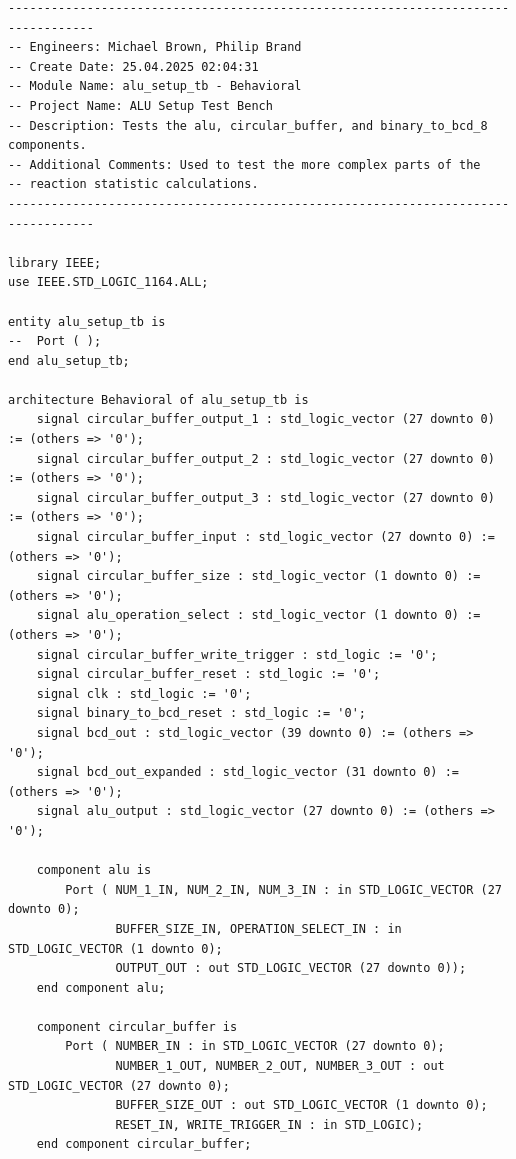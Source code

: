 \documentclass[11pt]{article}
\newenvironment{code}{\captionsetup{type=listing}}{}
\begin{document}
\vspace*{1cm}
\begin{code}
  \begin{verbatim}
----------------------------------------------------------------------------------
-- Engineers: Michael Brown, Philip Brand
-- Create Date: 25.04.2025 02:04:31
-- Module Name: alu_setup_tb - Behavioral
-- Project Name: ALU Setup Test Bench 
-- Description: Tests the alu, circular_buffer, and binary_to_bcd_8 components.
-- Additional Comments: Used to test the more complex parts of the 
-- reaction statistic calculations.
----------------------------------------------------------------------------------

library IEEE;
use IEEE.STD_LOGIC_1164.ALL;

entity alu_setup_tb is
--  Port ( );
end alu_setup_tb;

architecture Behavioral of alu_setup_tb is
    signal circular_buffer_output_1 : std_logic_vector (27 downto 0) := (others => '0');
    signal circular_buffer_output_2 : std_logic_vector (27 downto 0) := (others => '0');
    signal circular_buffer_output_3 : std_logic_vector (27 downto 0) := (others => '0');
    signal circular_buffer_input : std_logic_vector (27 downto 0) := (others => '0');
    signal circular_buffer_size : std_logic_vector (1 downto 0) := (others => '0');
    signal alu_operation_select : std_logic_vector (1 downto 0) := (others => '0');
    signal circular_buffer_write_trigger : std_logic := '0';
    signal circular_buffer_reset : std_logic := '0';
    signal clk : std_logic := '0';
    signal binary_to_bcd_reset : std_logic := '0';
    signal bcd_out : std_logic_vector (39 downto 0) := (others => '0');
    signal bcd_out_expanded : std_logic_vector (31 downto 0) := (others => '0');
    signal alu_output : std_logic_vector (27 downto 0) := (others => '0');
    
    component alu is
        Port ( NUM_1_IN, NUM_2_IN, NUM_3_IN : in STD_LOGIC_VECTOR (27 downto 0);
               BUFFER_SIZE_IN, OPERATION_SELECT_IN : in STD_LOGIC_VECTOR (1 downto 0);
               OUTPUT_OUT : out STD_LOGIC_VECTOR (27 downto 0));
    end component alu;

    component circular_buffer is
        Port ( NUMBER_IN : in STD_LOGIC_VECTOR (27 downto 0);
               NUMBER_1_OUT, NUMBER_2_OUT, NUMBER_3_OUT : out STD_LOGIC_VECTOR (27 downto 0);
               BUFFER_SIZE_OUT : out STD_LOGIC_VECTOR (1 downto 0);
               RESET_IN, WRITE_TRIGGER_IN : in STD_LOGIC);
    end component circular_buffer;


\end{verbatim}
\end{code}
\end{document}
